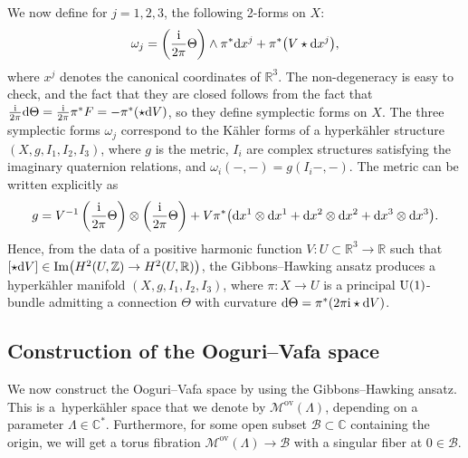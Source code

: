 We now define for $j=1,2,3$, the following 2-forms on $X$:
\begin{equation}\label{sympGH}
 \omega_j=\left(\frac{{\rm i}}{2\pi}\Theta\right)\wedge \pi^*{\rm d}x^j +\pi^*\bigl(V \star {\rm d}x^{j}\bigr),
\end{equation}
where $x^j$ denotes the canonical coordinates of $\mathbb{R}^3$. The non-degeneracy is easy to check, and the fact that they are closed follows from the fact that $\frac{{\rm i}}{2\pi}{\rm d}\Theta=\frac{{\rm i}}{2\pi}\pi^*F=-\pi^*(\star {\rm d}V)$, so they define symplectic forms on $X$. The three symplectic forms $\omega_j$ correspond to the K\"ahler forms of a hyperk\"ahler structure $(X,g,I_1,I_2,I_3)$, where $g$ is the metric, $I_i$ are complex structures satisfying the imaginary quaternion relations, and $\omega_i(-,-)=g(I_i-,-)$. The metric can be written explicitly as
\begin{equation}\label{HKmetric}
 g=V^{-1}\left(\frac{{\rm i}}{2\pi}\Theta\right)\otimes \left(\frac{{\rm i}}{2\pi}\Theta\right)+V\pi^*\bigl({\rm d}x^1\otimes {\rm d}x^1+{\rm d}x^2\otimes {\rm d}x^2+{\rm d}x^3\otimes {\rm d}x^3\bigr).
\end{equation}
Hence, from the data of a positive harmonic function $V\colon U\subset \mathbb{R}^{3}\to \mathbb{R}$ such that $[\star {\rm d}V]\in \operatorname{Im}\bigl(H^2(U,\mathbb{Z})\to H^2(U,\mathbb{R})\bigr)$, the Gibbons--Hawking ansatz produces a hyperk\"ahler manifold $(X,g,I_1,I_2,I_3)$, where $\pi\colon X\to U$ is a principal ${\rm U}(1)$-bundle admitting a connection $\Theta$ with curvature ${\rm d}\Theta=\pi^*(2\pi {\rm i}\star {\rm d}V)$.


\subsection{Construction of the Ooguri--Vafa space}\label{constructionOV}

We now construct the Ooguri--Vafa space by using the Gibbons--Hawking ansatz. This is a~hyperk\"ahler space that we denote by $\mathcal{M}^{\text{ov}}(\Lambda)$, depending on a parameter $\Lambda \in \mathbb{C}^*$. Furthermore, for some open subset $\mathcal{B}\subset \mathbb{C}$ containing the origin, we will get a torus fibration $\mathcal{M}^{\text{ov}}(\Lambda)\to \mathcal{B}$ with a singular fiber at $0 \in \mathcal{B}$.

